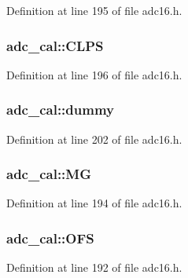 Definition at line 195 of file adc16.\+h.

\subsubsection[{\texorpdfstring{C\+L\+PS}{CLPS}}]{ adc\+\_\+cal\+::\+C\+L\+PS}\hypertarget{structadc__cal_ae07b7f5635b68df7023bc27c5c22acc3}{}\label{structadc__cal_ae07b7f5635b68df7023bc27c5c22acc3}


Definition at line 196 of file adc16.\+h.

\subsubsection[{\texorpdfstring{dummy}{dummy}}]{ adc\+\_\+cal\+::dummy}\hypertarget{structadc__cal_a280be7159cd5d56e45d69825463759cf}{}\label{structadc__cal_a280be7159cd5d56e45d69825463759cf}


Definition at line 202 of file adc16.\+h.

\subsubsection[{\texorpdfstring{MG}{MG}}]{ adc\+\_\+cal\+::\+MG}\hypertarget{structadc__cal_a69dbfb243398e6737333fb0651f091c8}{}\label{structadc__cal_a69dbfb243398e6737333fb0651f091c8}


Definition at line 194 of file adc16.\+h.

\subsubsection[{\texorpdfstring{O\+FS}{OFS}}]{ adc\+\_\+cal\+::\+O\+FS}\hypertarget{structadc__cal_ae4b1139e1b0ba3b8527c7385cac4412b}{}\label{structadc__cal_ae4b1139e1b0ba3b8527c7385cac4412b}


Definition at line 192 of file adc16.\+h.

